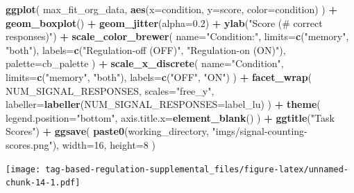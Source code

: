 \documentclass[]{book}
\newenvironment{Shaded}{\begin{snugshade}}{\end{snugshade}}
\newcommand{\DataTypeTok}[1]{\textcolor[rgb]{0.13,0.29,0.53}{#1}}
\newcommand{\DecValTok}[1]{\textcolor[rgb]{0.00,0.00,0.81}{#1}}
\newcommand{\FloatTok}[1]{\textcolor[rgb]{0.00,0.00,0.81}{#1}}
\newcommand{\KeywordTok}[1]{\textcolor[rgb]{0.13,0.29,0.53}{\textbf{#1}}}
\newcommand{\NormalTok}[1]{#1}
\newcommand{\OperatorTok}[1]{\textcolor[rgb]{0.81,0.36,0.00}{\textbf{#1}}}
\newcommand{\StringTok}[1]{\textcolor[rgb]{0.31,0.60,0.02}{#1}}
\begin{document}
\begin{Shaded}
\begin{Highlighting}[]
\KeywordTok{ggplot}\NormalTok{( max_fit_org_data, }\KeywordTok{aes}\NormalTok{(}\DataTypeTok{x=}\NormalTok{condition, }\DataTypeTok{y=}\NormalTok{score, }\DataTypeTok{color=}\NormalTok{condition) ) }\OperatorTok{+}
\StringTok{  }\KeywordTok{geom_boxplot}\NormalTok{() }\OperatorTok{+}
\StringTok{  }\KeywordTok{geom_jitter}\NormalTok{(}\DataTypeTok{alpha=}\FloatTok{0.2}\NormalTok{) }\OperatorTok{+}
\StringTok{  }\KeywordTok{ylab}\NormalTok{(}\StringTok{"Score (# correct responses)"}\NormalTok{) }\OperatorTok{+}
\StringTok{  }\KeywordTok{scale_color_brewer}\NormalTok{(}
    \DataTypeTok{name=}\StringTok{"Condition:"}\NormalTok{,}
    \DataTypeTok{limits=}\KeywordTok{c}\NormalTok{(}\StringTok{"memory"}\NormalTok{, }\StringTok{"both"}\NormalTok{),}
    \DataTypeTok{labels=}\KeywordTok{c}\NormalTok{(}\StringTok{"Regulation-off (OFF)"}\NormalTok{, }\StringTok{"Regulation-on (ON)"}\NormalTok{),}
    \DataTypeTok{palette=}\NormalTok{cb_palette}
\NormalTok{  ) }\OperatorTok{+}
\StringTok{  }\KeywordTok{scale_x_discrete}\NormalTok{(}
    \DataTypeTok{name=}\StringTok{"Condition"}\NormalTok{,}
    \DataTypeTok{limits=}\KeywordTok{c}\NormalTok{(}\StringTok{"memory"}\NormalTok{, }\StringTok{"both"}\NormalTok{),}
    \DataTypeTok{labels=}\KeywordTok{c}\NormalTok{(}\StringTok{"OFF"}\NormalTok{, }\StringTok{"ON"}\NormalTok{)}
\NormalTok{  ) }\OperatorTok{+}
\StringTok{  }\KeywordTok{facet_wrap}\NormalTok{(}
    \OperatorTok{~}\StringTok{ }\NormalTok{NUM_SIGNAL_RESPONSES,}
    \DataTypeTok{scales=}\StringTok{"free_y"}\NormalTok{,}
    \DataTypeTok{labeller=}\KeywordTok{labeller}\NormalTok{(}\DataTypeTok{NUM_SIGNAL_RESPONSES=}\NormalTok{label_lu)}
\NormalTok{  ) }\OperatorTok{+}
\StringTok{  }\KeywordTok{theme}\NormalTok{(}
    \DataTypeTok{legend.position=}\StringTok{"bottom"}\NormalTok{,}
    \DataTypeTok{axis.title.x=}\KeywordTok{element_blank}\NormalTok{()}
\NormalTok{  ) }\OperatorTok{+}
\StringTok{  }\KeywordTok{ggtitle}\NormalTok{(}\StringTok{"Task Scores"}\NormalTok{) }\OperatorTok{+}
\StringTok{  }\KeywordTok{ggsave}\NormalTok{(}
    \KeywordTok{paste0}\NormalTok{(working_directory, }\StringTok{"imgs/signal-counting-scores.png"}\NormalTok{),}
    \DataTypeTok{width=}\DecValTok{16}\NormalTok{,}
    \DataTypeTok{height=}\DecValTok{8}
\NormalTok{  )}
\end{Highlighting}
\end{Shaded}

\texttt{[image: tag-based-regulation-supplemental\_files/figure-latex/unnamed-chunk-14-1.pdf]}
\end{document}
